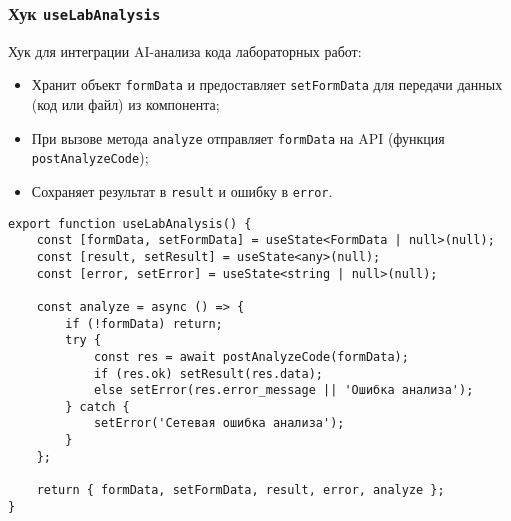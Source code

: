 \subsubsection{Хук \texttt{useLabAnalysis}}
Хук для интеграции AI-анализа кода лабораторных работ:
\begin{itemize}
  \item Хранит объект \texttt{formData} и предоставляет \texttt{setFormData} для передачи данных (код или файл) из компонента;
  \item При вызове метода \texttt{analyze} отправляет \texttt{formData} на API (функция \texttt{postAnalyzeCode});
  \item Сохраняет результат в \texttt{result} и ошибку в \texttt{error}.
\end{itemize}
\begin{lstlisting}[caption={Кастомный хук useLabAnalysis}, label={lst:useLabAnalysis}]
export function useLabAnalysis() {
    const [formData, setFormData] = useState<FormData | null>(null);
    const [result, setResult] = useState<any>(null);
    const [error, setError] = useState<string | null>(null);

    const analyze = async () => {
        if (!formData) return;
        try {
            const res = await postAnalyzeCode(formData);
            if (res.ok) setResult(res.data);
            else setError(res.error_message || 'Ошибка анализа');
        } catch {
            setError('Сетевая ошибка анализа');
        }
    };

    return { formData, setFormData, result, error, analyze };
}
\end{lstlisting}


